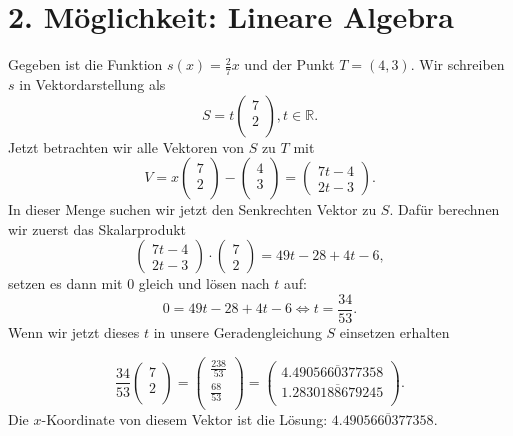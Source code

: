 \documentclass{article}
\begin{document}
\section*{2. Möglichkeit: Lineare Algebra}
Gegeben ist die Funktion \(s(x)=\frac27x\) und der Punkt \(T=(4, 3)\).
Wir schreiben \(s\) in Vektordarstellung als \[S=t\begin{pmatrix}7\\2\\\end{pmatrix}, t\in \mathbb{R}.\]
Jetzt betrachten wir alle Vektoren von \(S\) zu \(T\) mit
\[V=x\begin{pmatrix}7\\2\\\end{pmatrix} - \begin{pmatrix}4\\3\\\end{pmatrix}=
\begin{pmatrix}7t-4\\2t-3\end{pmatrix}.\] In dieser Menge suchen wir jetzt den Senkrechten Vektor
zu \(S\). Dafür berechnen wir zuerst das Skalarprodukt
\[\begin{pmatrix}7t-4\\2t-3\end{pmatrix}\cdot\begin{pmatrix}7\\2\end{pmatrix}=49t-28+4t-6,\] setzen 
es dann mit \(0\) gleich und lösen nach \(t\) auf:
\[0=49t-28+4t-6\Leftrightarrow t=\frac{34}{53}.\]
Wenn wir jetzt dieses \(t\) in unsere Geradengleichung \(S\) einsetzen erhalten

\[\frac{34}{53}\begin{pmatrix}7\\2\\\end{pmatrix}=
\begin{pmatrix}\frac{238}{53}\\\frac{68}{53}\\\end{pmatrix}=
\begin{pmatrix}4.\overline{4905660377358}\\1.\overline{2830188679245}\\\end{pmatrix}
.\]
Die \(x\)-Koordinate von diesem Vektor ist die Lösung: \(4.\overline{4905660377358}\).\\
\end{document}
